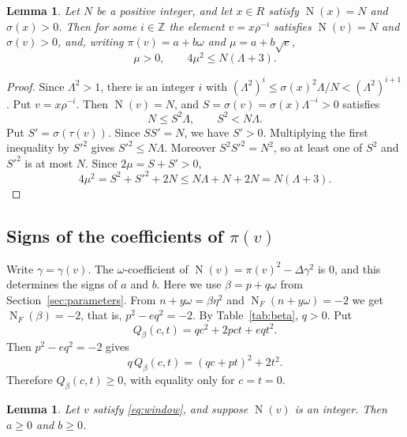 \documentclass[a4paper,11pt]{article}
\theoremstyle{plain}
\newtheorem{lemma}[theorem]{Lemma}
\theoremstyle{definition}
\theoremstyle{remark}
\numberwithin{equation}{section}
\numberwithin{table}{section}
\newcommand{\Z}{\mathbb{Z}}
\newcommand{\Nm}{\operatorname{N}}
\newcommand{\NF}{\operatorname{N}_F}
\newcommand{\tsec}[2]{\texorpdfstring{#1}{#2}}
\begin{document}
\begin{lemma}\label{lem:window}
Let $N$ be a positive integer, and let $x\in R$ satisfy $\Nm(x)=N$ and $\sigma(x)>0$.
Then for some $i\in\Z$ the element $v=x\rho^{-i}$ satisfies $\Nm(v)=N$ and $\sigma(v)>0$, and, writing $\pi(v)=a+b\omega$ and $\mu=a+b\sqrt e$,
\begin{equation}\label{eq:window}
\mu>0,\qquad 4\mu^2\le N(\Lambda+3).
\end{equation}
\end{lemma}

\begin{proof}
Since $\Lambda^2>1$, there is an integer $i$ with $(\Lambda^2)^i\le\sigma(x)^2\Lambda/N<(\Lambda^2)^{i+1}$.
Put $v=x\rho^{-i}$. Then $\Nm(v)=N$, and $S=\sigma(v)=\sigma(x)\Lambda^{-i}>0$ satisfies
\[
N\le S^2\Lambda,\qquad S^2<N\Lambda.
\]
Put $S'=\sigma(\tau(v))$. Since $SS'=N$, we have $S'>0$. Multiplying the first inequality by $S'^2$ gives $S'^2\le N\Lambda$.
Moreover $S^2S'^2=N^2$, so at least one of $S^2$ and $S'^2$ is at most $N$.
Since $2\mu=S+S'>0$,
\[
4\mu^2=S^2+S'^2+2N\le N\Lambda+N+2N=N(\Lambda+3).
\]
\end{proof}

\subsection{Signs of the coefficients of \tsec{$\pi(v)$}{pi(v)}}

Write $\gamma=\gamma(v)$. The $\omega$-coefficient of $\Nm(v)=\pi(v)^2-\Delta\gamma^2$ is $0$, and this determines the signs of $a$ and $b$.
Here we use $\beta=p+q\omega$ from Section~\ref{sec:parameters}. From $n+y\omega=\beta\eta^2$ and $\NF(n+y\omega)=-2$ we get $\NF(\beta)=-2$, that is, $p^2-eq^2=-2$. By Table~\ref{tab:beta}, $q>0$.
Put
\[
Q_\beta(c,t)=qc^2+2pct+eqt^2.
\]
Then $p^2-eq^2=-2$ gives
\begin{equation}\label{eq:qbeta}
q\,Q_\beta(c,t)=(qc+pt)^2+2t^2.
\end{equation}
Therefore $Q_\beta(c,t)\ge0$, with equality only for $c=t=0$.

\begin{lemma}\label{lem:signs}
Let $v$ satisfy \eqref{eq:window}, and suppose $\Nm(v)$ is an integer. Then $a\ge0$ and $b\ge0$.
\end{lemma}
\end{document}
